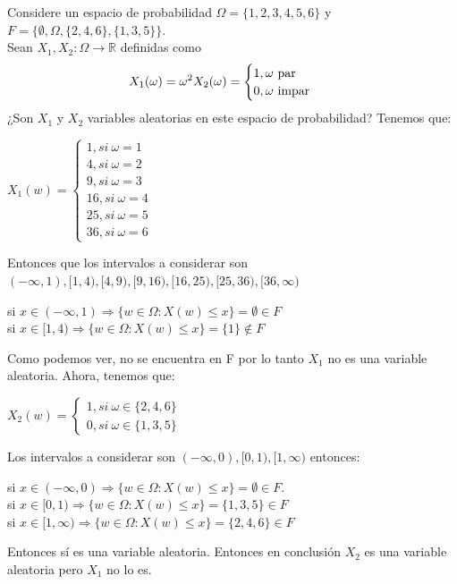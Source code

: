 \documentclass[12pt,a4paper]{report}
\begin{document}
\begin{enumerate}
{		%

		\item {
			Considere un espacio de probabilidad $\Omega = \{1, 2, 3, 4, 5, 6\}$ y
			$F = \{\emptyset, \Omega, \{2, 4, 6\}, \{1, 3, 5\}\}$.\\
			Sean $X_1, X_2 : \Omega \rightarrow \mathbb{R}$ definidas como
			\begin{align*}
				X_1(\omega) = \omega^2 & X_2(\omega) = \begin{cases}
																								1, \omega $ par$\\
																								0, \omega $ impar$
																							\end{cases}
			\end{align*}
			¿Son $X_1$ y $X_2$ variables aleatorias en este espacio de probabilidad?
			Tenemos que: \\
			\begin{center}
			    $X_{1}(w)= \begin{cases} 1, si\ \omega=1\\ 4,si \ \omega=2 \\ 9, si \ \omega=3\\ 16, si \ \omega=4 \\ 25, si \ \omega=5 \\ 36, si \ \omega=6  \end{cases}$
			\end{center}
			Entonces que los intervalos a considerar son $(-\infty,1),[1,4),[4,9),[9,16),[16,25),[25,36),[36,\infty)$\\
			\begin{center}
			    si $x\in (-\infty,1) \Rightarrow \lbrace w\in \Omega : X(w)\leq x \rbrace = \emptyset \in F $ \\ 
			    si $x\in [1,4) \Rightarrow \lbrace w \in \Omega : X(w) \leq x \rbrace = \lbrace 1 \rbrace \notin F$
			\end{center}
			Como podemos ver, no se encuentra en F por lo tanto  $X_{1}$ no es una variable aleatoria. Ahora, tenemos que:\\
			\begin{center}
			    $X_{2}(w) = \begin{cases}
			    1, si \ \omega \in \lbrace 2,4,6 \rbrace \\
			    0, si \ \omega \in \lbrace 1,3,5 \rbrace 
			    \end{cases}$
			\end{center}
			}
			Los intervalos a considerar son $(-\infty,0),[0,1),[1,\infty)$ entonces:\\
			\begin{center}
			    si $x\in (-\infty,0) \Rightarrow \lbrace w\in \Omega: X(w) \leq x \rbrace = \emptyset \in F. $\\
			    si $x\in [0,1) \Rightarrow \lbrace w \in \Omega: X(w) \leq x \rbrace = \lbrace 1,3,5 \rbrace \in F$  \\
			    si $x\in [1,\infty) \Rightarrow \lbrace w\in \Omega: X(w)\leq x \rbrace = \lbrace 2,4,6 \rbrace \in F$
			\end{center}
		    Entonces sí es una variable aleatoria. Entonces en conclusión $X_{2}$ es una variable aleatoria pero $X_{1}$ no lo es.
		}
		

\end{enumerate}
\end{document}
